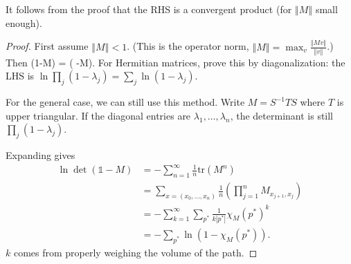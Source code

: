 \documentclass[12pt]{book}
\theoremstyle{norm}
\begin{document}
It follows from the proof that the RHS is a convergent product (for $\left\Vert {M}\right\Vert$ small enough).
\begin{proof}
First assume $\left\Vert {M}\right\Vert<1$. (This is the operator norm, $\left\Vert {M}\right\Vert=\max_v\frac{\left\Vert {Mv}\right\Vert}{\left\Vert {v}\right\Vert}$.) Then
\be
\ln \det(1-M)  = \ln ( -M).
\ee
For Hermitian matrices, prove this by diagonalization: the LHS is $\ln \prod_j (1-\lambda_j) = \sum_j \ln (1-\lambda_j)$. 

For the general case, we can still use this method. Write $M=S^{-1}TS$ where $T$ is upper triangular. If the diagonal entries are $\lambda_1,\ldots, \lambda_n$, the determinant is still $\prod_j(1-\lambda_j)$. 

Expanding gives
\begin{align*}
\ln \det(\mathds{1}-M) &= -\sum_{n=1}^{\infty} \frac{1}{n} \text{tr}(M^n) \\
&= \sum_{x = (x_0,\ldots, x_n)} \frac{1}{n} \left( {\prod_{j=1}^n M_{x_{j+1},x_j}} \right) \\
&=-\sum_{k=1}^{\infty}\sum_{p^*} \frac{1}{k|p^*|} \chi_M(p^*)^k\\
&=-\sum_{p^*} \ln (1-\chi_M(p^*)).
\end{align*}
$k$ comes from properly weighing the volume of the path.
\end{proof}
\end{document}
